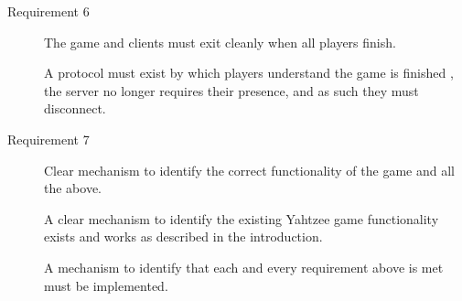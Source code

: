 \begin{description}
	\item  [Requirement 6] The game and clients must exit cleanly when all players finish.
	
	A protocol must exist by which players understand the game is finished , the server no longer
	requires their presence, and as such they must disconnect.
	
	\item  [Requirement 7] Clear mechanism to identify the correct functionality of the game and all the above.
	
	A clear mechanism to identify the existing Yahtzee game functionality exists and works as described in the introduction.
	
	A mechanism to identify that each and every requirement above is met must be implemented.

\end{description}